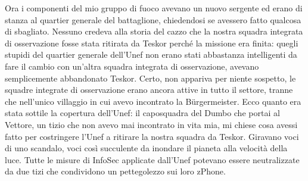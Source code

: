 Ora i componenti del mio gruppo di fuoco avevano un nuovo sergente ed
erano di stanza al quartier generale del battaglione, chiedendosi se
avessero fatto qualcosa di sbagliato. Nessuno credeva alla storia del
cazzo che la nostra squadra integrata di osservazione fosse stata
ritirata da Teskor perché la missione era finita: quegli stupidi del
quartier generale dell'Unef non erano stati abbastanza intelligenti da
fare il cambio con un'altra squadra integrata di osservazione, avevano
semplicemente abbandonato Teskor. Certo, non appariva per niente
sospetto, le squadre integrate di osservazione erano ancora attive in
tutto il settore, tranne che nell'unico villaggio in cui avevo
incontrato la Bürgermeister. Ecco quanto era stata sottile la copertura
dell'Unef: il caposquadra del Dumbo che portai al Vettore, un tizio che
non avevo mai incontrato in vita mia, mi chiese cosa avessi fatto per
costringere l'Unef a ritirare la nostra squadra da Teskor. Giravano voci
di uno scandalo, voci così succulente da inondare il pianeta alla
velocità della luce. Tutte le misure di InfoSec applicate dall'Unef
potevano essere neutralizzate da due tizi che condividono un
pettegolezzo sui loro zPhone.